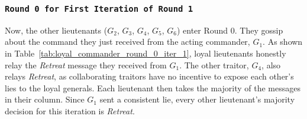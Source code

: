 \documentclass[11pt]{article}
\newcommand{\gen}[1]{\ensuremath{G_{#1}}}
\begin{document}
\subsubsection*{\texttt{\large Round 0 for First Iteration of Round 1}}
\justifying
Now, the other lieutenants ($\gen{2}$, $\gen{3}$, $\gen{4}$, $\gen{5}$, $\gen{6}$) enter Round 0. They gossip about the command they just received from the acting commander, $\gen{1}$. As shown in Table~\ref{tab:loyal_commander_round_0_iter_1}, loyal lieutenants honestly relay the \textit{Retreat} message they received from $\gen{1}$. The other traitor, $\gen{4}$, also relays \textit{Retreat}, as collaborating traitors have no incentive to expose each other's lies to the loyal generals. Each lieutenant then takes the majority of the messages in their column. Since $\gen{1}$ sent a consistent lie, every other lieutenant's majority decision for this iteration is \textit{Retreat}.
\end{document}
